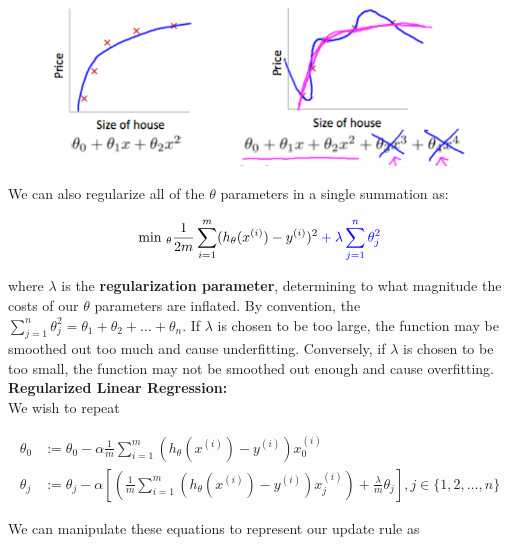 \documentclass{article}
\begin{document}
        \begin{figure}[hbt!]
            \centering
            \includegraphics[scale=0.75]{Resources/Regularization}
        \end{figure}

        \noindent We can also regularize all of the $\theta$ parameters in a single summation as:

        \begin{align*}
            \text{min }_{\theta}\frac{1}{2m}\sum^m_{i=1}(h_\theta(x^{(i)})-y^{(i)})^2
            \color{blue} + \lambda \sum^n_{j=1}\theta^2_j \color{black}
        \end{align*}

        \noindent where $\lambda$ is the \textbf{regularization parameter}, determining to what magnitude the
        costs of our $\theta$ parameters are inflated. By convention, the $\sum^n_{j=1}\theta^2_j=\theta_1+
        \theta_2+\dots+\theta_n$. If $\lambda$ is chosen to be too large, the function may be smoothed out too
        much and cause underfitting. Conversely, if $\lambda$ is chosen to be too small, the function may not
        be smoothed out enough and cause overfitting. \\

        \noindent \textbf{Regularized Linear Regression:} \\
        We wish to repeat

        \begin{align*}
            \theta_0    &:= \theta_0-\alpha\frac{1}{m}\sum^m_{i=1} (h_\theta(x^{(i)})-y^{(i)})x_0^{(i)} \\
            \theta_j    &:= \theta_j-\alpha\left[\left(\frac{1}{m}\sum^m_{i=1}(h_\theta(x^{(i)})-y^{(i)})x_j^{(i)}
                            \right)+\frac{\lambda}{m}\theta_j\right], j\in\{1,2,\dots,n\}
        \end{align*}

        \noindent We can manipulate these equations to represent our update rule as
\end{document}
